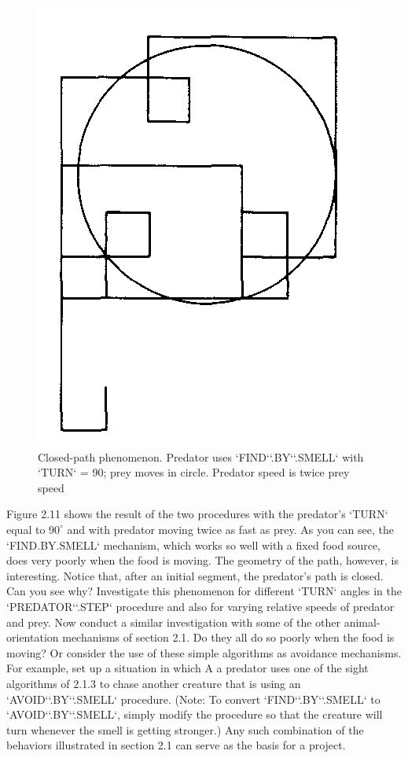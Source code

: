 \documentclass{book}
\begin{document}
\begin{figure}
\begin{center}
\includegraphics[scale=1]{fig2-11}
\caption{Closed-path phenomenon. Predator uses \textsc{`FIND`}\textsc{`.BY`}\textsc{`.SMELL`} with \textsc{`TURN`} = 90; prey moves in circle. Predator speed is twice prey speed}
\end{center}
\end{figure}

Figure 2.11 shows the result of the two procedures with the predator's
\textsc{`TURN`} equal to $90^{\circ}$ and with predator moving twice as fast as prey. As
you can see, the \textsc{`FIND.BY.SMELL`} mechanism, which works so well with
a fixed food source, does very poorly when the food is moving. The
geometry of the path, however, is interesting. Notice that, after an initial
segment, the predator's path is closed. Can you see why? Investigate this
phenomenon for different \textsc{`TURN`} angles in the \textsc{`PREDATOR`}\textsc{`.STEP`} procedure
and also for varying relative speeds of predator and prey.
Now conduct a similar investigation with some of the other animal-orientation mechanisms of section 2.1. Do they all do so poorly when
the food is moving? Or consider the use of these simple algorithms
as avoidance mechanisms. For example, set up a situation in which
A a predator uses one of the sight algorithms of 2.1.3 to chase another
creature that is using an \textsc{`AVOID`}\textsc{`.BY`}\textsc{`.SMELL`} procedure. (Note: To convert
\textsc{`FIND`}\textsc{`.BY`}\textsc{`.SMELL`} to \textsc{`AVOID`}\textsc{`.BY`}\textsc{`.SMELL`}, simply modify the procedure so
that the creature will turn whenever the smell is getting stronger.) Any
such combination of the behaviors illustrated in section 2.1 can serve as
the basis for a project.
\end{document}
